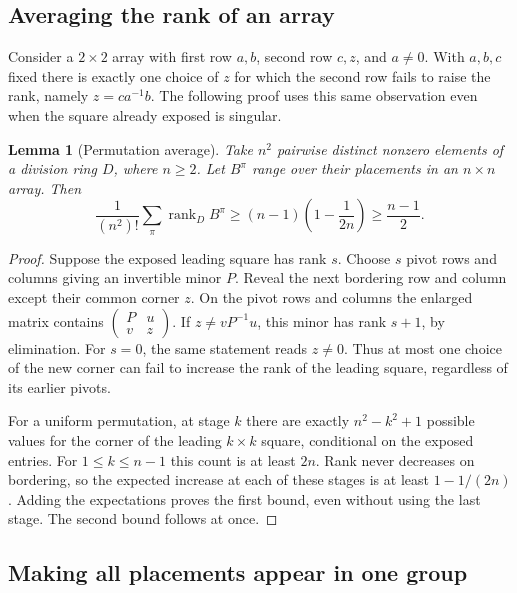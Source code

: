 \documentclass[11pt,a4paper]{article}
\newtheorem{lemma}[theorem]{Lemma}
\numberwithin{equation}{section}
\begin{document}
\subsection{Averaging the rank of an array}

Consider a \(2\times2\) array with first row \(a,b\), second row
\(c,z\), and \(a\ne0\). With \(a,b,c\) fixed there is exactly one choice
of \(z\) for which the second row fails to raise the rank, namely
\(z=ca^{-1}b\). The following proof uses this same observation even
when the square already exposed is singular.

\begin{lemma}[Permutation average]\label{lem:permutation}
Take \(n^2\) pairwise distinct nonzero elements of a division ring \(D\),
where \(n\ge2\). Let \(B^\pi\) range over their placements in an
\(n\times n\) array. Then
\begin{equation}\label{eq:perm-avg}
 \frac{1}{(n^2)!}\sum_\pi \operatorname{rank}_D B^\pi
 \ge (n-1)\left(1-\frac1{2n}\right)\ge\frac{n-1}{2}.
\end{equation}
\end{lemma}

\begin{proof}
Suppose the exposed leading square has rank \(s\). Choose \(s\)
pivot rows and columns giving an invertible minor \(P\). Reveal the
next bordering row and column except their common corner \(z\). On the
pivot rows and columns the enlarged matrix contains
\(\left(\begin{smallmatrix}P&u\\v&z\end{smallmatrix}\right)\).
If \(z\ne vP^{-1}u\), this minor has rank \(s+1\), by elimination.
For \(s=0\), the same statement reads \(z\ne0\). Thus at most one
choice of the new corner can fail to increase the rank of the leading
square, regardless of its earlier pivots.

For a uniform permutation, at stage \(k\) there are exactly
\(n^2-k^2+1\) possible values for the corner of the leading
\(k\times k\) square, conditional on the exposed entries. For
\(1\le k\le n-1\) this count is at least \(2n\). Rank never decreases
on bordering, so the expected increase at each of these stages is
at least \(1-1/(2n)\). Adding the expectations proves the first bound,
even without using the last stage. The second bound follows at once.
\end{proof}

\subsection{Making all placements appear in one group}
\end{document}

